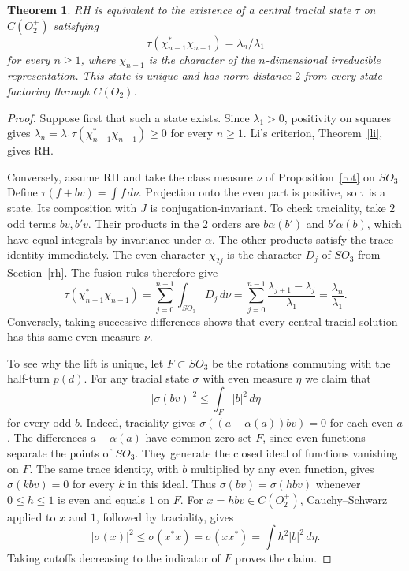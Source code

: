 \documentclass[11pt,a4paper]{article}
\newtheorem{thm}{Theorem}[section]
\begin{document}
\begin{samepage}
\begin{thm}\label{li-trace}
RH is equivalent to the existence of a central tracial state $\tau$ on $C(O_2^+)$ satisfying
\[
 \tau(\chi_{n-1}^*\chi_{n-1})=\lambda_n/\lambda_1
\]
for every $n\geq1$, where $\chi_{n-1}$ is the character of the $n$-dimensional irreducible representation. This state is unique and has norm distance $2$ from every state factoring through $C(O_2)$.
\end{thm}
\end{samepage}
\begin{proof}
Suppose first that such a state exists. Since $\lambda_1>0$, positivity on squares gives $\lambda_n=\lambda_1\tau(\chi_{n-1}^*\chi_{n-1})\geq0$ for every $n\geq1$. Li's criterion, Theorem~\ref{li}, gives RH.

Conversely, assume RH and take the class measure $\nu$ of Proposition~\ref{rot} on $SO_3$. Define $\tau(f+bv)=\int f\,d\nu$. Projection onto the even part is positive, so $\tau$ is a state. Its composition with $J$ is conjugation-invariant. To check traciality, take $2$ odd terms $bv,b'v$. Their products in the $2$ orders are $b\alpha(b')$ and $b'\alpha(b)$, which have equal integrals by invariance under $\alpha$. The other products satisfy the trace identity immediately. The even character $\chi_{2j}$ is the character $D_j$ of $SO_3$ from Section~\ref{rh}. The fusion rules therefore give
\[
 \tau(\chi_{n-1}^*\chi_{n-1})
 =\sum_{j=0}^{n-1}\int_{SO_3}D_j\,d\nu
 =\sum_{j=0}^{n-1}\frac{\lambda_{j+1}-\lambda_j}{\lambda_1}
 =\frac{\lambda_n}{\lambda_1}.
\]
Conversely, taking successive differences shows that every central tracial solution has this same even measure $\nu$.

To see why the lift is unique, let $F\subset SO_3$ be the rotations commuting with the half-turn $p(d)$. For any tracial state $\sigma$ with even measure $\eta$ we claim that
\[
 |\sigma(bv)|^2\leq\int_F |b|^2\,d\eta
\]
for every odd $b$. Indeed, traciality gives $\sigma((a-\alpha(a))bv)=0$ for each even $a$. The differences $a-\alpha(a)$ have common zero set $F$, since even functions separate the points of $SO_3$. They generate the closed ideal of functions vanishing on $F$. The same trace identity, with $b$ multiplied by any even function, gives $\sigma(kbv)=0$ for every $k$ in this ideal. Thus $\sigma(bv)=\sigma(hbv)$ whenever $0\leq h\leq1$ is even and equals $1$ on $F$. For $x=hbv\in C(O_2^+)$, Cauchy--Schwarz applied to $x$ and $1$, followed by traciality, gives
\[
 |\sigma(x)|^2\leq\sigma(x^*x)=\sigma(xx^*)=\int h^2|b|^2\,d\eta .
\]
Taking cutoffs decreasing to the indicator of $F$ proves the claim.


\end{proof}
\end{document}
